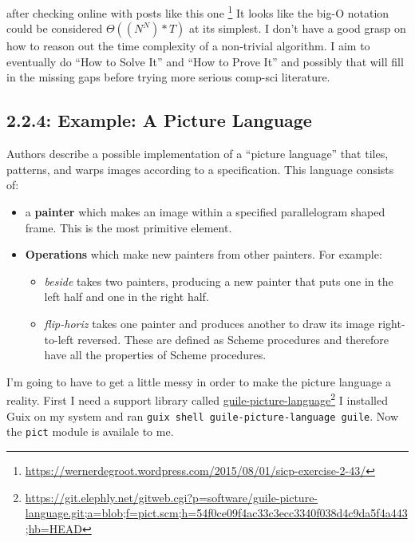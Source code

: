 \documentclass[final,fleqn,titlepage,twoside]{article}
\begin{document}
after checking online with posts like this one \footnote{\url{https://wernerdegroot.wordpress.com/2015/08/01/sicp-exercise-2-43/}} It looks
like the big-O notation could be considered \(\Theta((N^N)*T)\) at its simplest.
I don't have a good grasp on how to reason out the time complexity of a
non-trivial algorithm. I aim to eventually do ``How to Solve It'' and ``How to
Prove It'' and possibly that will fill in the missing gaps before trying more
serious comp-sci literature.

\subsection{2.2.4: Example: A Picture Language}
\label{sec:orgf73c0f6}
Authors describe a possible implementation of a ``picture language'' that tiles,
patterns, and warps images according to a specification. This language consists
of:

\begin{itemize}
\item a \textbf{painter} which makes an image within a specified parallelogram shaped
frame. This is the most primitive element.
\item \textbf{Operations} which make new painters from other painters. For example:
\begin{itemize}
\item \emph{beside} takes two painters, producing a new painter that puts one in the
left half and one in the right half.
\item \emph{flip-horiz} takes one painter and produces another to draw its image
right-to-left reversed. These are defined as Scheme procedures and therefore
have all the properties of Scheme procedures.
\end{itemize}
\end{itemize}

I'm going to have to get a little messy in order to make the picture language a
reality. First I need a support library called \href{https://git.elephly.net/gitweb.cgi?p=software/guile-picture-language.git;a=blob;f=pict.scm;h=54f0ce09f4ac33c3ecc3340f038d4c9da5f4a443;hb=HEAD}{guile-picture-language}\footnote{\url{https://git.elephly.net/gitweb.cgi?p=software/guile-picture-language.git;a=blob;f=pict.scm;h=54f0ce09f4ac33c3ecc3340f038d4c9da5f4a443;hb=HEAD}} I
installed Guix on my system and ran \texttt{guix shell guile-picture-language guile}. Now the \texttt{pict} module is availale to me.
\end{document}
